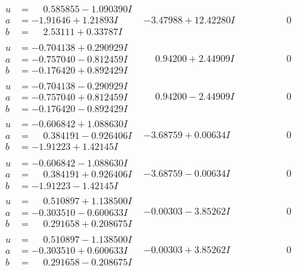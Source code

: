 \documentclass[1p]{elsarticle_modified}
\theoremstyle{definition}
\begin{document}
$$\begin{array}{c|c|c}
\begin{aligned}
u &= \phantom{-}0.585855 - 1.090390 I \\
a &= -1.91646 + 1.21893 I \\
b &= \phantom{-}2.53111 + 0.33787 I\end{aligned}
 & -3.47988 + 12.42280 I & \phantom{-0.000000 } 0 \\ \hline\begin{aligned}
u &= -0.704138 + 0.290929 I \\
a &= -0.757040 - 0.812459 I \\
b &= -0.176420 + 0.892429 I\end{aligned}
 & \phantom{-}0.94200 + 2.44909 I & \phantom{-0.000000 } 0 \\ \hline\begin{aligned}
u &= -0.704138 - 0.290929 I \\
a &= -0.757040 + 0.812459 I \\
b &= -0.176420 - 0.892429 I\end{aligned}
 & \phantom{-}0.94200 - 2.44909 I & \phantom{-0.000000 } 0 \\ \hline\begin{aligned}
u &= -0.606842 + 1.088630 I \\
a &= \phantom{-}0.384191 - 0.926406 I \\
b &= -1.91223 + 1.42145 I\end{aligned}
 & -3.68759 + 0.00634 I & \phantom{-0.000000 } 0 \\ \hline\begin{aligned}
u &= -0.606842 - 1.088630 I \\
a &= \phantom{-}0.384191 + 0.926406 I \\
b &= -1.91223 - 1.42145 I\end{aligned}
 & -3.68759 - 0.00634 I & \phantom{-0.000000 } 0 \\ \hline\begin{aligned}
u &= \phantom{-}0.510897 + 1.138500 I \\
a &= -0.303510 - 0.600633 I \\
b &= \phantom{-}0.291658 + 0.208675 I\end{aligned}
 & -0.00303 - 3.85262 I & \phantom{-0.000000 } 0 \\ \hline\begin{aligned}
u &= \phantom{-}0.510897 - 1.138500 I \\
a &= -0.303510 + 0.600633 I \\
b &= \phantom{-}0.291658 - 0.208675 I\end{aligned}
 & -0.00303 + 3.85262 I & \phantom{-0.000000 } 0\\

\end{array}$$
\end{document}
